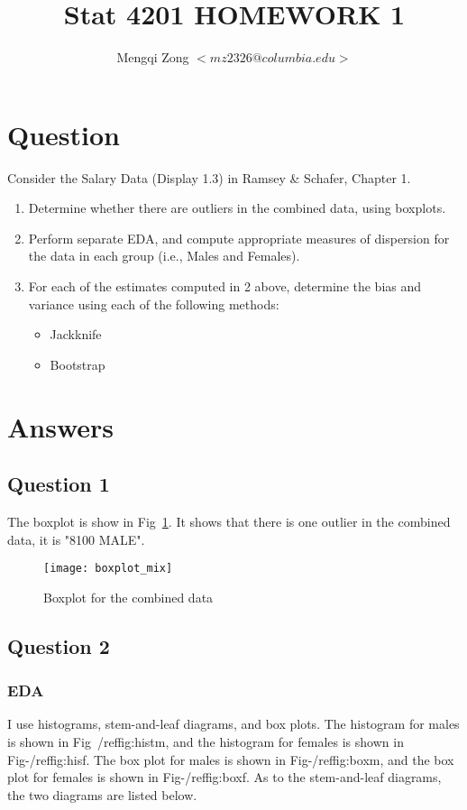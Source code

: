 \documentclass{article}
\title{Stat 4201 HOMEWORK 1}
\author{Mengqi Zong $<mz2326@columbia.edu>$}
\begin{document}
\maketitle

\section{Question}
Consider the Salary Data (Display 1.3) in Ramsey \& Schafer, Chapter 1.
\begin{enumerate}
\item Determine whether there are outliers in the combined data, using
boxplots.
\item Perform separate EDA, and compute appropriate measures of
dispersion for the data in each group (i.e., Males and Females).
\item For each of the estimates computed in 2 above, determine the bias
and variance using each of the following methods:
\begin{itemize}
\item Jackknife
\item Bootstrap
\end{itemize}
\end{enumerate}

\section{Answers}

\subsection{Question 1}
The boxplot is show in Fig~\ref{fig:box_mix}. It shows that there is one
outlier in the combined data, it is "8100 MALE".

\begin{figure}[ht!]
  \centering
  \texttt{[image: boxplot\_mix]}
  \caption{Boxplot for the combined data \label{fig:box_mix}}
\end{figure}

\subsection{Question 2}

\subsubsection{EDA}
I use histograms, stem-and-leaf diagrams, and box plots. The histogram
for males is shown in Fig~/ref{fig:histm}, and the histogram for
females is shown in Fig-/ref{fig:hisf}. The box plot for males is
shown in Fig-/ref{fig:boxm}, and the box plot for females is shown in
Fig-/ref{fig:boxf}. As to the stem-and-leaf diagrams, the two diagrams
are listed below.\\
\end{document}
